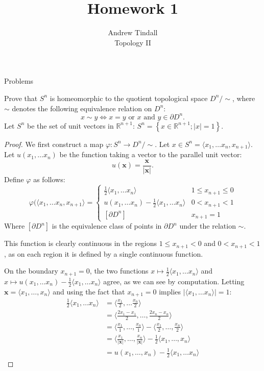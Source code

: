 \documentclass[12pt]{article}
\newcommand{\R}{\mathbb{R}}
\theoremstyle{definition}
\newenvironment{problem}[2][Problem]{\begin{trivlist}
\item[\hskip \labelsep {\bfseries #1}\hskip \labelsep {\bfseries #2.}]}{\end{trivlist}}
\begin{document}
 
 
\title{Homework 1}
\author{Andrew Tindall\\
Topology II}
\maketitle
\begin{section}{Problems}
	\begin{problem}{1}
		Prove that $S^n$ is homeomorphic to the quotient topological space $D^n/\sim$, where $\sim$ denotes the following equivalence relation on $D^n$:
		\[x \sim y \iff x = y \text{ or } x \text{ and } y \in \partial D^n. \]
		Let $S^n$ be the set of unit vectors in $\R^{n+1}$: $S^n = \left\{ x \in \R^{n+1}; \left \lvert { x } \right \lvert  = 1 \right\}$.
		\begin{proof}
			We first construct a map $\varphi: S^n \to D^n / \sim$. Let $x \in S^{n} = \langle x_1, \dots x_{n}, x_{n+1}\rangle$. Let $u(x_1, \dots x_n)$ be the function taking a vector to the parallel unit vector:
			\[u(\mathbf{x}) = \frac{\mathbf{x}}{\left \lvert { \mathbf{x} } \right \lvert }.\]Define $\varphi$ as follows:
			\[\varphi(\langle x_1, \dots x_n, x_{n+1}\rangle = \begin{cases}
						\frac{1}{2}\langle x_1, \dots x_n \rangle & 1 \leq x_{n+1} \leq 0\\
						u(x_1, \dots x_n) - \frac{1}{2}\langle x_1, \dots x_n\rangle & 0 < x_{n+1} < 1\\
						[\partial D^{n}] & x_{n+1} = 1

			\end{cases}\]
			Where $[\partial D^n]$ is the equivalence class of points in $\partial D^{n}$ under the relation $\sim$.
			\par This function is clearly continuous in the regions $1 \leq x_{n+1} < 0$ and $0 < x_{n+1} < 1$, as on each region it is defined by a single continuous function. 
			\par On the boundary $x_{n+1} = 0$, the two functions $x \mapsto \frac{1}{2} \langle x_1, \dots x_n\rangle$ and $x \mapsto u(x_1, \dots x_n) - \frac{1}{2} \langle x_1, \dots x_n\rangle$ agree, as we can see by computation. Letting $\mathbf{x} = \langle x_1, \dots , x_n\rangle$ and using the fact that $x_{n+1} = 0$ implies $\left \lvert { \langle x_1, \dots x_n\rangle  } \right \lvert  = 1$:
			\begin{align*}
				\frac{ 1}{2}\langle x_1, \dots x_n \rangle &= \langle \frac{x_1}{ 2} , \dots \frac{x_n}{2}\rangle\\
				&= \langle \frac{ 2x_1 - x_1}{2}, \dots, \frac{2x_n - x_n}{2}\rangle\\
				&= \langle \frac{x_1}{1}, \dots , \frac{ x_n}{1}\rangle - \langle \frac{x_1}{2}, \dots , \frac{x_n}{2}\rangle\\
			&= \langle \frac{x_1}{\left \lvert { \mathbf{x} } \right \lvert }, \dots , \frac{x_n}{\left \lvert { \mathbf{x} } \right \lvert }\rangle - \frac{1}{2} \langle x_1, \dots , x_n\rangle\\
			&= u(x_1, \dots , x_n) - \frac{ 1}{2} \langle x_1, \dots x_n\rangle
			\end{align*}


\end{proof}
\end{problem}
\end{section}
\end{document}
